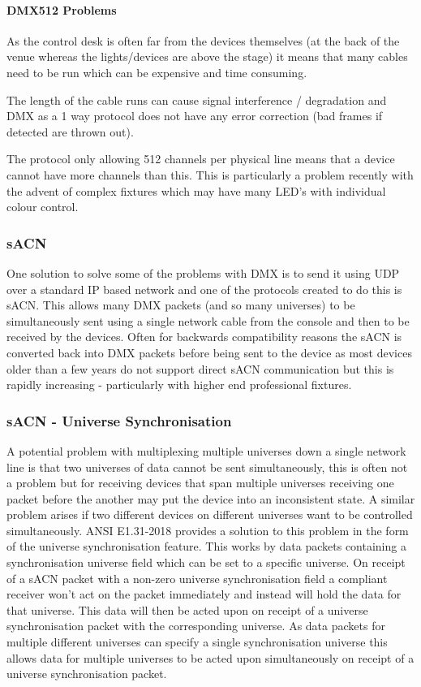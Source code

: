 \documentclass[11pt,a4paper]{report}
\begin{document}
	\paragraph*{DMX512 Problems}
	\begin{list}{}{}
		\item As the control desk is often far from the devices themselves (at the back of the venue whereas the lights/devices are above the stage) it means that many cables need to be run which can be expensive and time consuming.
		\item The length of the cable runs can cause signal interference / degradation and DMX as a 1 way protocol does not have any error correction (bad frames if detected are thrown out).
		\item The protocol only allowing 512 channels per physical line means that a device cannot have more channels than this. This is particularly a problem recently with the advent of complex fixtures which may have many LED's with individual colour control.
	\end{list}
	
	\subsubsection{sACN}
	One solution to solve some of the problems with DMX is to send it using UDP over a standard IP based network and one of the protocols created to do this is sACN. This allows many DMX packets (and so many universes) to be simultaneously sent using a single network cable from the console and then to be received by the devices. Often for backwards compatibility reasons the sACN is converted back into DMX packets before being sent to the device as most devices older than a few years do not support direct sACN communication but this is rapidly increasing - particularly with higher end professional fixtures. 
	
\subsubsection{sACN - Universe Synchronisation}
A potential problem with multiplexing multiple universes down a single network line is that two universes of data cannot be sent simultaneously, this is often not a problem but for receiving devices that span multiple universes receiving one packet before the another may put the device into an inconsistent state. A similar problem arises if two different devices on different universes want to be controlled simultaneously. ANSI E1.31-2018 provides a solution to this problem in the form of the universe synchronisation feature. This works by data packets containing a synchronisation universe field which can be set to a specific universe. On receipt of a sACN packet with a non-zero universe synchronisation field a compliant receiver won't act on the packet immediately and instead will hold the data for that universe. This data will then be acted upon on receipt of a universe synchronisation packet with the corresponding universe. As data packets for multiple different universes can specify a single synchronisation universe this allows data for multiple universes to be acted upon simultaneously on receipt of a universe synchronisation packet.
	
\end{document}
